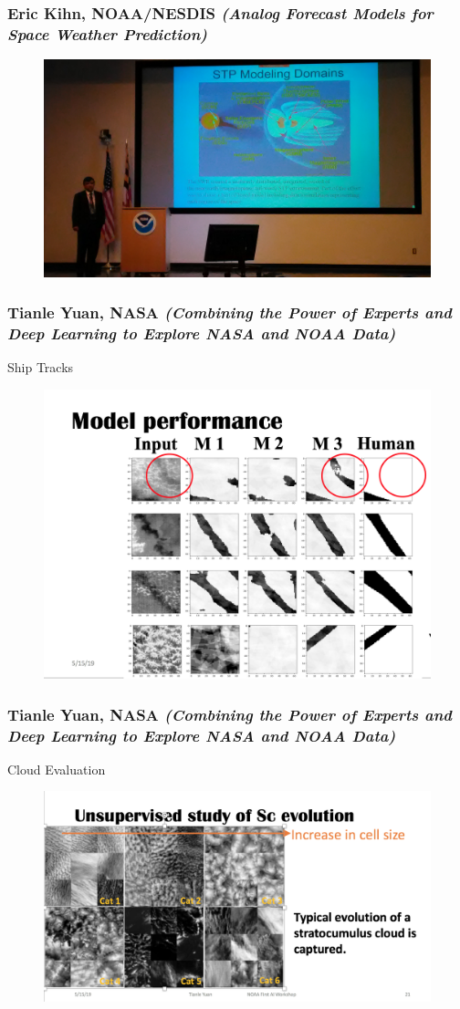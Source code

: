 \documentclass{beamer}
\begin{document}
\begin{frame}
\frametitle{Eric Kihn, NOAA/NESDIS \textit{(Analog Forecast Models for Space Weather Prediction)}}
\begin{figure}
	\includegraphics[width=.9\linewidth]{figs/P_20190425_093405.jpg}
\end{figure}
\end{frame}

\begin{frame}
\frametitle{Tianle Yuan, NASA \textit{(Combining the Power of Experts and Deep Learning to Explore NASA and NOAA Data)}}
Ship Tracks
\begin{figure}
	\includegraphics[width=.75\linewidth]{figs/ScreenShot_ModelPerformance.png}
\end{figure}
\end{frame}

\begin{frame}
\frametitle{Tianle Yuan, NASA \textit{(Combining the Power of Experts and Deep Learning to Explore NASA and NOAA Data)}}
Cloud Evaluation
\begin{figure}
	\includegraphics[width=.9\linewidth]{figs/ScreenShot_CloudEvaluation.png}
\end{figure}
\end{frame}
\end{document}
